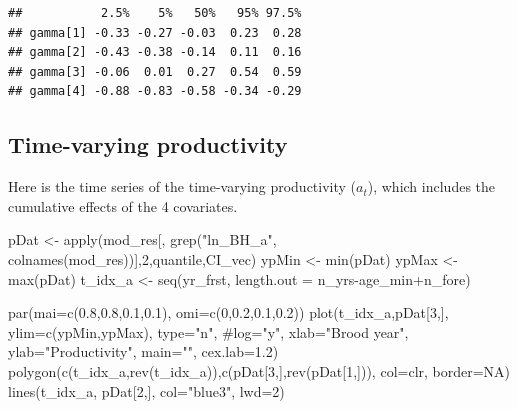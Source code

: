 \documentclass[11pt,]{article}
\newenvironment{Shaded}{}{}
\newcommand{\KeywordTok}[1]{\textcolor[rgb]{0.00,0.00,1.00}{#1}}
\newcommand{\DataTypeTok}[1]{#1}
\newcommand{\DecValTok}[1]{#1}
\newcommand{\FloatTok}[1]{#1}
\newcommand{\StringTok}[1]{\textcolor[rgb]{0.00,0.50,0.50}{#1}}
\newcommand{\CommentTok}[1]{\textcolor[rgb]{0.00,0.50,0.00}{#1}}
\newcommand{\OtherTok}[1]{\textcolor[rgb]{1.00,0.25,0.00}{#1}}
\newcommand{\OperatorTok}[1]{#1}
\newcommand{\NormalTok}[1]{#1}
\begin{document}
\begin{verbatim}
##           2.5%    5%   50%   95% 97.5%
## gamma[1] -0.33 -0.27 -0.03  0.23  0.28
## gamma[2] -0.43 -0.38 -0.14  0.11  0.16
## gamma[3] -0.06  0.01  0.27  0.54  0.59
## gamma[4] -0.88 -0.83 -0.58 -0.34 -0.29
\end{verbatim}

\subsection{Time-varying productivity}\label{time-varying-productivity}

Here is the time series of the time-varying productivity (\(a_t\)),
which includes the cumulative effects of the 4 covariates.

\begin{Shaded}
\begin{Highlighting}[]
\NormalTok{pDat <-}\StringTok{ }\KeywordTok{apply}\NormalTok{(mod_res[, }\KeywordTok{grep}\NormalTok{(}\StringTok{"ln_BH_a"}\NormalTok{, }\KeywordTok{colnames}\NormalTok{(mod_res))],}\DecValTok{2}\NormalTok{,quantile,CI_vec)}
\NormalTok{ypMin <-}\StringTok{ }\KeywordTok{min}\NormalTok{(pDat)}
\NormalTok{ypMax <-}\StringTok{ }\KeywordTok{max}\NormalTok{(pDat)}
\NormalTok{t_idx_a <-}\StringTok{ }\KeywordTok{seq}\NormalTok{(yr_frst, }\DataTypeTok{length.out =}\NormalTok{ n_yrs}\OperatorTok{-}\NormalTok{age_min}\OperatorTok{+}\NormalTok{n_fore)}

\KeywordTok{par}\NormalTok{(}\DataTypeTok{mai=}\KeywordTok{c}\NormalTok{(}\FloatTok{0.8}\NormalTok{,}\FloatTok{0.8}\NormalTok{,}\FloatTok{0.1}\NormalTok{,}\FloatTok{0.1}\NormalTok{), }\DataTypeTok{omi=}\KeywordTok{c}\NormalTok{(}\DecValTok{0}\NormalTok{,}\FloatTok{0.2}\NormalTok{,}\FloatTok{0.1}\NormalTok{,}\FloatTok{0.2}\NormalTok{))}
\KeywordTok{plot}\NormalTok{(t_idx_a,pDat[}\DecValTok{3}\NormalTok{,], }\DataTypeTok{ylim=}\KeywordTok{c}\NormalTok{(ypMin,ypMax), }\DataTypeTok{type=}\StringTok{"n"}\NormalTok{, }\CommentTok{#log="y",}
     \DataTypeTok{xlab=}\StringTok{"Brood year"}\NormalTok{, }\DataTypeTok{ylab=}\StringTok{"Productivity"}\NormalTok{, }\DataTypeTok{main=}\StringTok{""}\NormalTok{, }\DataTypeTok{cex.lab=}\FloatTok{1.2}\NormalTok{)}
\KeywordTok{polygon}\NormalTok{(}\KeywordTok{c}\NormalTok{(t_idx_a,}\KeywordTok{rev}\NormalTok{(t_idx_a)),}\KeywordTok{c}\NormalTok{(pDat[}\DecValTok{3}\NormalTok{,],}\KeywordTok{rev}\NormalTok{(pDat[}\DecValTok{1}\NormalTok{,])), }\DataTypeTok{col=}\NormalTok{clr, }\DataTypeTok{border=}\OtherTok{NA}\NormalTok{)}
\KeywordTok{lines}\NormalTok{(t_idx_a, pDat[}\DecValTok{2}\NormalTok{,], }\DataTypeTok{col=}\StringTok{"blue3"}\NormalTok{, }\DataTypeTok{lwd=}\DecValTok{2}\NormalTok{)}
\end{Highlighting}
\end{Shaded}
\end{document}
